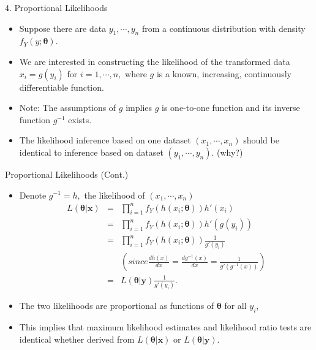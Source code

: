 \documentclass{beamer}
\begin{document}
 \begin{frame}{4. Proportional Likelihoods}
        \begin{itemize}
        \item Suppose there are data $y_{1}, \cdots, y_{n}$ from a continuous distribution with density $f_{Y}(y;\boldsymbol{\theta})$. 
        \item We are interested in constructing the likelihood of the transformed data $x_{i} = g(y_{i})$ for $i = 1, \cdots, n,$ where $g$ is a known, increasing, continuously differentiable function. 
        \item Note: The assumptions of $g$ implies $g$ is one-to-one function and its inverse function $g^{-1}$ exists.
        \item The likelihood inference based on one dataset $(x_{1}, \cdots, x_{n})$ should be identical to inference based on dataset $(y_{1}, \cdots, y_{n})$. (why?)
        \end{itemize}
    \end{frame}
    
\begin{frame}{Proportional Likelihoods (Cont.)}
        \begin{itemize}
        \item Denote $g^{-1} = h,$ the likelihood of $(x_{1}, \cdots, x_{n})$
            \begin{eqnarray}
        L(\boldsymbol{\theta}|\boldsymbol{x})  & = & \prod^{n}_{i=1}f_{Y}(h(x_{i};\boldsymbol{\theta}))h'(x_{i})   \nonumber\\
        & = & \prod^{n}_{i=1}f_{Y}(h(x_{i};\boldsymbol{\theta}))h'(g(y_{i}))\nonumber\\
        & = & \prod^{n}_{i=1}f_{Y}(h(x_{i};\boldsymbol{\theta}))\frac{1}{g'(y_{i})} \\\nonumber
        & & (since \frac{dh(x)}{dx} = \frac{dg^{-1}(x)}{dx} = \frac{1}{g'(g^{-1}(x))})\nonumber\\
        & = & L(\boldsymbol{\theta}|\boldsymbol{y}) \frac{1}{g'(y_{i})}.\nonumber
            \end{eqnarray}
            \item The two likelihoods are proportional as functions of $\boldsymbol{\theta}$ for all $y_{i}$, \item This implies that maximum likelihood estimates and likelihood ratio tests are identical whether derived from        $L(\boldsymbol{\theta}|\boldsymbol{x})$ or        $L(\boldsymbol{\theta}|\boldsymbol{y})$. 
        \end{itemize}
    \end{frame}
\end{document}
